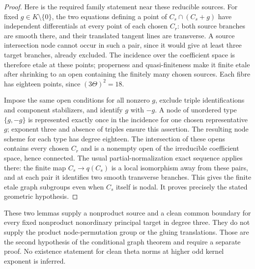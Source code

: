 \begin{proof}
Here is the required family statement near these reducible sources.
For fixed $g\in K\setminus\{0\}$, the two equations defining a
point of $C_s\cap(C_s+g)$ have independent differentials at every
point of each chosen $C_r$: both source branches are smooth there,
and their translated tangent lines are transverse. A source
intersection node cannot occur in such a pair, since it would give
at least three target branches, already excluded. The incidence
over the coefficient space is therefore etale at these points;
properness and quasi-finiteness make it finite etale after shrinking
to an open containing the finitely many chosen sources. Each fibre
has eighteen points, since $(3\Theta)^2=18$.

Impose the same open conditions for all nonzero $g$, exclude triple
identifications and component stabilizers, and identify $g$ with
$-g$. A node of unordered type $\{g,-g\}$ is represented exactly
once in the incidence for one chosen representative $g$; exponent
three and absence of triples ensure this assertion. The resulting
node scheme for each type has degree eighteen. The intersection of
these opens contains every chosen $C_r$ and is a nonempty open of
the irreducible coefficient space, hence connected. The usual
partial-normalization exact sequence applies there: the finite map
$C_s\to q(C_s)$ is a local isomorphism away from these pairs, and
at each pair it identifies two smooth transverse branches. This
gives the finite etale graph subgroups even when $C_s$ itself is
nodal. It proves precisely the stated geometric hypothesis.
\end{proof}

\begin{remark}
\label{rem:root-three-neighbor-boundary-scope-candidate}
These two lemmas supply a nonproduct source and a clean common
boundary for every fixed nonproduct nonordinary principal target
in degree three. They do not supply the product node-permutation
group or the gluing translations. Those are the second hypothesis
of the conditional graph theorem and require a separate proof.
No existence statement for clean theta norms at higher odd kernel
exponent is inferred.
\end{remark}
